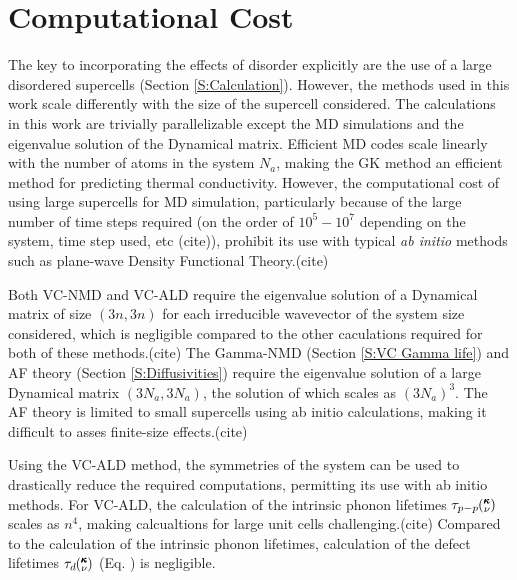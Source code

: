 \documentclass[aps,prb,onecolumn,preprint,superscriptaddress,amsmath,amssymb,floatfix]{revtex4}
\newcommand{\kv}{\mspace{-4.0mu}\left(\mspace{-8.0mu}
\begin{smallmatrix}&\pmb{\kappa} \\&\nu\end{smallmatrix}
\mspace{-3.0mu}\right)}
\begin{document}
\appendix

\section{\label{A:Computational Cost}
Computational Cost}

The key to incorporating the effects of disorder explicitly are the use 
of a large disordered supercells (Section \ref{S:Calculation}). 
However, the methods used 
in this work scale differently with the size of the supercell considered. 
The calculations in this work are trivially parallelizable\cite{} 
except the 
MD simulations\cite{plimpton_fast_1995} and the eigenvalue solution of the 
Dynamical matrix.\cite{gale_general_2003} Efficient MD 
codes scale linearly with the number of atoms in the system $N_a$, making 
the GK method an efficient method for predicting thermal conductivity. 
However, the computational cost of using large supercells for MD simulation, 
particularly because of the large number of time steps required 
(on the order of $10^5 - 10^7$ depending on the 
system, time step used, etc (cite)), prohibit its use with typical 
\emph{ab initio} methods such as 
plane-wave Density Functional Theory.(cite) 

Both VC-NMD and VC-ALD require the eigenvalue solution 
of a Dynamical matrix of size $(3n,3n)$ for each irreducible wavevector 
of the system size considered, 
which is negligible compared to the other 
caculations required for both of these methods.(cite) 
The Gamma-NMD (Section \ref{S:VC Gamma life}) and 
AF theory (Section \ref{S:Diffusivities}) 
require the eigenvalue solution of a large Dynamical matrix $(3N_a,3N_a)$, 
the solution of which scales as $(3N_a)^3$. 
The AF theory is limited 
to small supercells using ab initio calculations, making it difficult 
to asses finite-size effects.(cite)  

Using the VC-ALD method, the symmetries of the system can be 
used to drastically reduce the required computations, permitting its 
use with ab initio methods.
\cite{esfarjani_method_2008,turney_predicting_2009,
esfarjani_heat_2011,chaput_phonon-phonon_2011} 
For VC-ALD, the calculation of the intrinsic phonon 
lifetimes $\tau_{p-p}\kv$ scales as $n^4$,\cite{turney_predicting_2009}  
making calcualtions for large unit cells challenging.(cite) 
Compared to 
the calculation of the intrinsic phonon lifetimes, calculation 
of the defect lifetimes $\tau_d\kv$ (Eq. ) is negligible.
\end{document}
